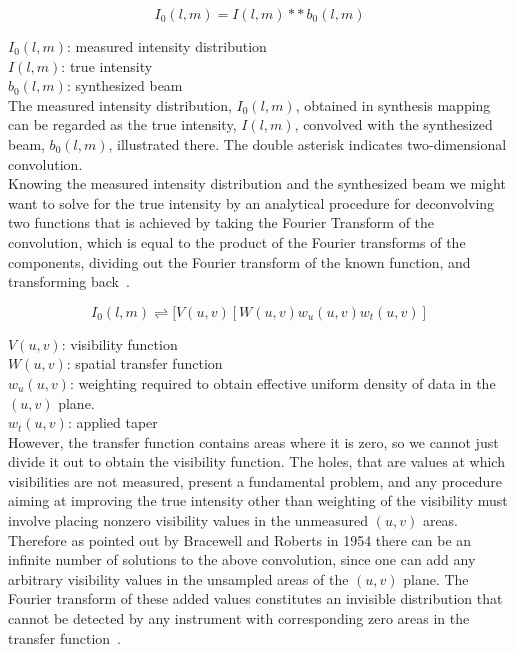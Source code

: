\begin{equation}
I_0(l,m) = I(l,m)\ast{\ast}{\,}b_0(l,m)
\end{equation}

$I_0(l,m)$: measured intensity distribution\\
$I(l,m)$: true intensity\\
$b_0(l,m)$: synthesized beam\\

The measured intensity distribution, $I_0(l,m)$, obtained in synthesis mapping can be regarded as the true intensity, $I(l,m)$, convolved with the synthesized beam, $b_0(l,m)$, illustrated there. The double asterisk indicates two-dimensional convolution.\\
Knowing the measured intensity distribution and the synthesized beam we might want to solve for the true intensity by an analytical procedure for deconvolving two functions that is achieved by taking the Fourier Transform of the convolution, which is equal to the product of the Fourier transforms of the components, dividing out the Fourier transform of the known function, and transforming back~\citep[Pg.~426]{thompson2008interferometry}. 

\begin{equation}
\label{eq:convolBack}
I_0(l,m) \rightleftharpoons [V(u,v)[W(u,v)w_u(u,v)w_t(u,v)]
\end{equation}

$V(u,v)$: visibility function\\
$W(u,v)$: spatial transfer function\\
$w_u(u,v)$: weighting required to obtain effective uniform density of data in the $(u,v)$ plane.\\
$w_t(u,v)$: applied taper\\

However, the transfer function contains areas where it is zero, so we cannot just divide it out to obtain the visibility function. The holes, that are values at which visibilities are not measured, present a fundamental problem, and any procedure aiming at improving the true intensity other than weighting of the visibility must involve placing nonzero visibility values in the unmeasured $(u, v)$ areas. Therefore as pointed out by Bracewell and Roberts in 1954 there can be an infinite number of solutions to the above convolution, since one can add any arbitrary visibility values in the unsampled areas of the $(u,v)$ plane. The Fourier transform of these added values constitutes an invisible distribution that cannot be detected by any instrument with corresponding zero areas in the transfer function~\citep[Pg.~427]{thompson2008interferometry}.

